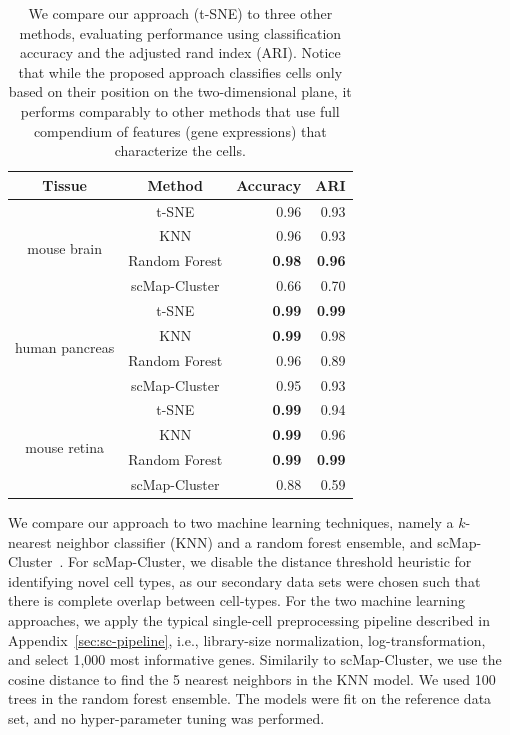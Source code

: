 \documentclass[runningheads]{llncs}
\begin{document}
\begin{table}[ht]
\centering
  \setlength\tabcolsep{6pt}
  \begin{tabular}{c c r r}
  \toprule
  Tissue & Method & Accuracy & ARI \\
  \toprule
  \multirow{4}{*}{mouse brain} & t-SNE & 0.96 & 0.93 \\
   & KNN & 0.96 & 0.93 \\
   & Random Forest & \textbf{0.98} & \textbf{0.96} \\
   & scMap-Cluster & 0.66 & 0.70 \\
  \midrule
  \multirow{4}{*}{human pancreas} & t-SNE & \textbf{0.99} & \textbf{0.99} \\
   & KNN & \textbf{0.99} & 0.98 \\
   & Random Forest & 0.96 & 0.89 \\
   & scMap-Cluster & 0.95 & 0.93 \\
  \midrule
  \multirow{4}{*}{mouse retina} & t-SNE & \textbf{0.99} & 0.94 \\
   & KNN & \textbf{0.99} & 0.96 \\
   & Random Forest & \textbf{0.99} & \textbf{0.99} \\
   & scMap-Cluster & 0.88 & 0.59 \\
  \bottomrule
  \end{tabular}
  \caption{We compare our approach (t-SNE) to three other methods, evaluating
    performance using classification accuracy and the adjusted rand index (ARI).
    Notice that while the proposed approach classifies cells only based on their
    position on the two-dimensional plane, it performs comparably to other
    methods that use full compendium of features (gene expressions) that
    characterize the cells.}
  \label{tab:scores}
\end{table}

We compare our approach to two machine learning techniques, namely a $k$-nearest
neighbor classifier (KNN) and a random forest ensemble, and
scMap-Cluster~\cite{Kiselev2018}. For scMap-Cluster, we disable the distance
threshold heuristic for identifying novel cell types, as our secondary data sets
were chosen such that there is complete overlap between cell-types. For the two
machine learning approaches, we apply the typical single-cell preprocessing
pipeline described in Appendix~\ref{sec:sc-pipeline}, i.e., library-size
normalization, log-transformation, and select 1,000 most informative genes.
Similarily to scMap-Cluster, we use the cosine distance to find the 5 nearest
neighbors in the KNN model. We used 100 trees in the random forest ensemble. The
models were fit on the reference data set, and no hyper-parameter tuning was
performed.
\end{document}
